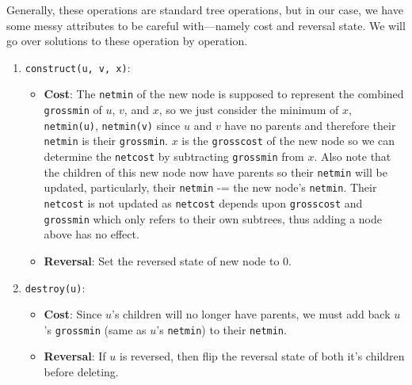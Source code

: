 \documentclass[a4paper, 11pt]{article}
\begin{document}
Generally, these operations are standard tree operations, but in our case, we have some messy attributes to be careful with—namely cost and reversal state. We will go over solutions to these operation by operation.
\begin{enumerate}
\item \texttt{construct(u, v, x)}:
\begin{itemize}
    \item \textbf{Cost}: The \texttt{netmin} of the new node is supposed to represent the combined \texttt{grossmin} of \(u\), \(v\), and \(x\), so we just consider the minimum of \(x\), \texttt{netmin(u)}, \texttt{netmin(v)} since \(u\) and \(v\) have no parents and therefore their \texttt{netmin} is their \texttt{grossmin}. \(x\) is the \texttt{grosscost} of the new node so we can determine the \texttt{netcost} by subtracting \texttt{grossmin} from \(x\). Also note that the children of this new node now have parents so their \texttt{netmin} will be updated, particularly, their \texttt{netmin} -= the new node’s \texttt{netmin}. Their \texttt{netcost} is not updated as \texttt{netcost} depends upon \texttt{grosscost} and \texttt{grossmin} which only refers to their own subtrees, thus adding a node above has no effect.
    \item \textbf{Reversal}: Set the reversed state of new node to 0.
\end{itemize}

\item \texttt{destroy(u)}:
\begin{itemize}
    \item \textbf{Cost}: Since \(u\)'s children will no longer have parents, we must add back \(u\)'s \texttt{grossmin} (same as $u$'s \texttt{netmin}) to their \texttt{netmin}.
    \item \textbf{Reversal}: If $u$ is reversed, then flip the reversal state of both it's children before deleting.
\end{itemize}


\end{enumerate}
\end{document}
